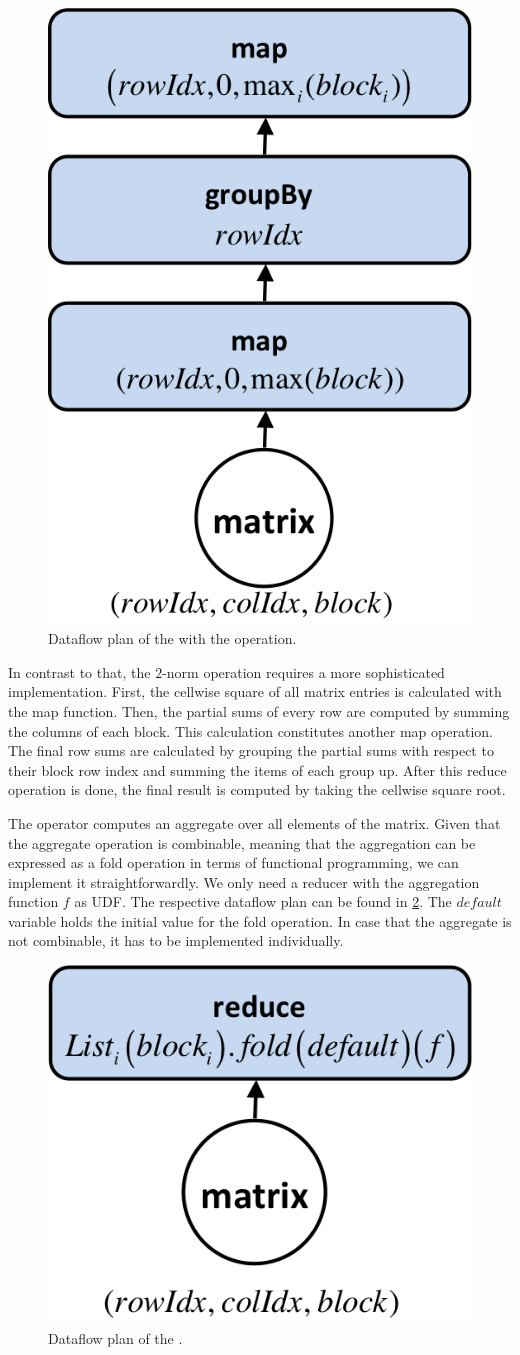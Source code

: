 \begin{figure}[!h]
	\centering
	\includegraphics[width=0.25\linewidth]{images/planMaximumVectorwiseTransformation.png}
	\caption{Dataflow plan of the  with the  operation.}
	\label{fig:planMaximumVectorwiseTransformation}
\end{figure}

In contrast to that, the $2$-norm operation requires a more sophisticated implementation.
First, the cellwise square of all matrix entries is calculated with the map function.
Then, the partial sums of every row are computed by summing the columns of each block.
This calculation constitutes another map operation.
The final row sums are calculated by grouping the partial sums with respect to their block row index and summing the items of each group up.
After this reduce operation is done, the final result is computed by taking the cellwise square root.

The  operator computes an aggregate over all elements of the matrix.
Given that the aggregate operation is combinable, meaning that the aggregation can be expressed as a fold operation in terms of functional programming, we can implement it straightforwardly.
We only need a reducer with the aggregation function $f$ as UDF.
The respective dataflow plan can be found in \cref{fig:planAggregateMatrixTransformation}.
The $default$ variable holds the initial value for the fold operation.
In case that the aggregate is not combinable, it has to be implemented individually.

\begin{figure}[!h]
	\centering
	\includegraphics[width=0.25\linewidth]{images/planAggregateMatrixTransformation.png}
	\caption{Dataflow plan of the .}
	\label{fig:planAggregateMatrixTransformation}
\end{figure}